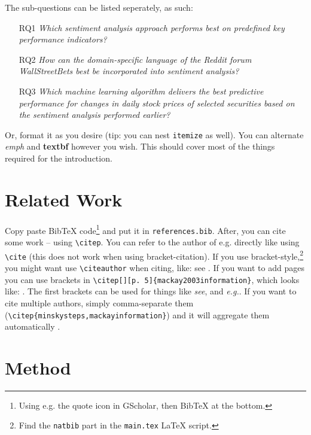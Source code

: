 \documentclass[11pt, a4paper]{article}
\begin{document}
\noindent The sub-questions can be listed seperately, as such:

\begin{itemize}
    \item[RQ1] \emph{Which sentiment analysis approach performs best on predefined key performance indicators?}
    \item[RQ2] \emph{How can the domain-specific language of the Reddit forum WallStreetBets best be incorporated into sentiment analysis?}
    \item[RQ3] \emph{Which machine learning algorithm delivers the best predictive performance for changes in daily stock prices of selected securities based on the sentiment analysis performed earlier?}
\end{itemize}

\noindent Or, format it as you desire (tip: you can nest \texttt{itemize} as well). You can alternate \emph{emph} and \textbf{textbf} however you wish. This should cover most of the things required for the introduction.

\section{Related Work}

Copy paste BibTeX code\footnote{Using e.g. the quote icon in GScholar, then BibTeX at the bottom.} and put it in \texttt{references.bib}. After, you can cite some work \citep{mackay2003information} -- using \texttt{\textbackslash citep}. You can refer to the author of e.g. \cite{minsky1961steps} directly like using \texttt{\textbackslash cite} (this does not work when using bracket-citation). If you use bracket-style,\footnote{Find the \texttt{natbib} part in the \texttt{main.tex} \LaTeX{} script.} you might want use \texttt{\textbackslash citeauthor} when citing, like: see \citeauthor{ananny2018seeing} \cite{ananny2018seeing}.  If you want to add pages you can use brackets in \texttt{\textbackslash citep[][p. 5]\{mackay2003information\}}, which looks like: \citep[][p. 5]{mackay2003information}. The first brackets can be used for things like \emph{see}, and \emph{e.g.}. If you want to cite multiple authors, simply comma-separate them (\texttt{\textbackslash citep\{\-minsky\-steps,\-mackay\-information\}}) and it will aggregate them automatically \citep{minsky1961steps,mackay2003information}.

\section{Method}
\end{document}
